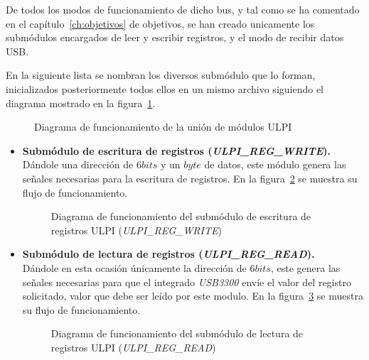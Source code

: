 De todos los modos de funcionamiento de dicho bus, y tal como se ha comentado en el capítulo~\ref{ch:objetivos} de objetivos, se han creado unicamente los submódulos encargados de leer y escribir registros, y el modo de recibir datos USB.

En la siguiente lista se nombran los diversos submódulo que lo forman, inicializados posteriormente todos ellos en un mismo archivo siguiendo el diagrama mostrado en la figura~\ref{fig:flujo_ulpi_main}.

\begin{figure}[hbtp]
    \centering
    \scalebox{0.8} {}
    \caption{Diagrama de funcionamiento de la unión de módulos ULPI}
    \label{fig:flujo_ulpi_main}
\end{figure}

\begin{itemize}
    \item \textbf{Submódulo de escritura de registros (\emph{ULPI\_REG\_WRITE}).} \\
    Dándole una dirección de $6bits$ y un $byte$ de datos, este módulo genera las señales necesarias para la escritura de registros. En la figura~\ref{fig:flujo_ulpi_write} se muestra su flujo de funcionamiento.
    \begin{figure}[hbtp]
        \centering
        \scalebox{0.8} {}
        \caption{Diagrama de funcionamiento del submódulo de escritura de registros ULPI (\emph{ULPI\_REG\_WRITE})}
        \label{fig:flujo_ulpi_write}
    \end{figure}
    
    \item \textbf{Submódulo de lectura de registros (\emph{ULPI\_REG\_READ}).} \\
    Dándole en esta ocasión únicamente la dirección de $6bits$, este genera las señales necesarias para que el integrado \emph{USB3300} envíe el valor del registro solicitado, valor que debe ser leído por este modulo. En la figura~\ref{fig:flujo_ulpi_read} se muestra su flujo de funcionamiento.
    \begin{figure}[hbtp]
        \centering
        \scalebox{0.8} {}
        \caption{Diagrama de funcionamiento del submódulo de lectura de registros ULPI (\emph{ULPI\_REG\_READ})}
        \label{fig:flujo_ulpi_read}
    \end{figure}
    

\end{itemize}

